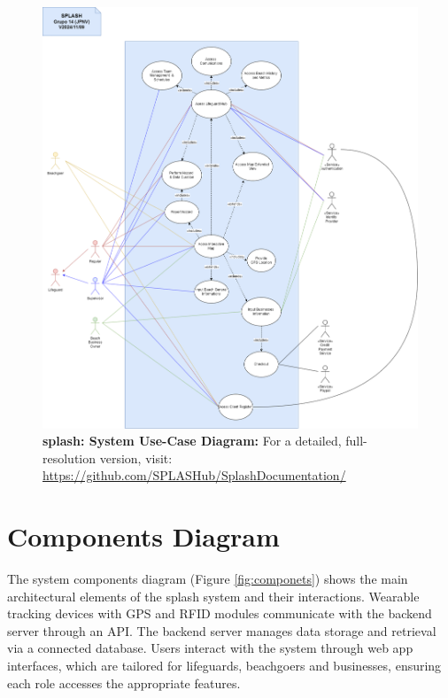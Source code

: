 \begin{figure}[H]
      \centering
      \includegraphics[width=16cm]{figs/use_case_diagram.png}
      \caption{ \textbf{\ac{splash}: System Use-Case Diagram:} For a detailed, full-resolution version, visit: 
      \url{https://github.com/SPLASHub/SplashDocumentation/}}
      \label{fig:use_case_diagram}
\end{figure}

\newpage
\section{Components Diagram}

The system components diagram (Figure \ref{fig:componets}) shows the main architectural elements of the \ac{splash} system and their interactions. Wearable tracking devices with GPS and RFID modules communicate with the backend server through an API. The backend server manages data storage and retrieval via a connected database. Users interact with the system through web app interfaces, which are tailored for lifeguards, beachgoers and businesses, ensuring each role accesses the appropriate features.

